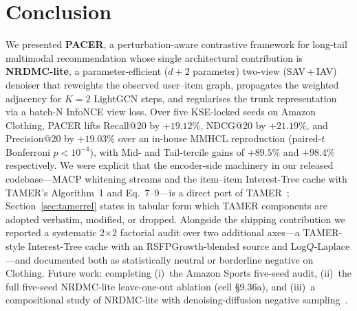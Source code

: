 \documentclass[conference]{IEEEtran}
\begin{document}
\section{Conclusion}

We presented \textbf{PACER}, a perturbation-aware contrastive
framework for long-tail multimodal recommendation whose single
architectural contribution is \textbf{NRDMC-lite}, a parameter-efficient
($d{+}2$ parameter) two-view (SAV\,+\,IAV) denoiser that reweights
the observed user--item graph, propagates the weighted adjacency for
$K{=}2$ LightGCN steps, and regularises the trunk representation via
a batch-N InfoNCE view loss. Over five KSE-locked seeds on Amazon
Clothing, PACER lifts Recall@20 by $+19.12\%$, NDCG@20 by $+21.19\%$,
and Precision@20 by $+19.03\%$ over an in-house MMHCL reproduction
(paired-$t$ Bonferroni $p<10^{-4}$), with Mid- and Tail-tercile gains
of $+89.5\%$ and $+98.4\%$ respectively. We were explicit that the
encoder-side machinery in our released codebase---MACP whitening
streams and the item--item Interest-Tree cache with TAMER's
Algorithm~1 and Eq.~7--9---is a direct port of
TAMER~\cite{meng2025tamer}; Section~\ref{sec:tamerrel} states in
tabular form which TAMER components are adopted verbatim, modified,
or dropped. Alongside the shipping contribution we reported a
systematic 2$\times$2 factorial audit over two additional axes---a
TAMER-style Interest-Tree cache with an RSFPGrowth-blended source and
Log$Q$-Laplace---and documented both as statistically neutral or
borderline negative on Clothing. Future work: completing (i)~the
Amazon Sports five-seed
audit, (ii)~the full five-seed NRDMC-lite leave-one-out ablation
(cell \S9.36a), and (iii)~a compositional study of NRDMC-lite with
denoising-diffusion negative sampling~\cite{nguyen2024diffusion}.



\end{document}
